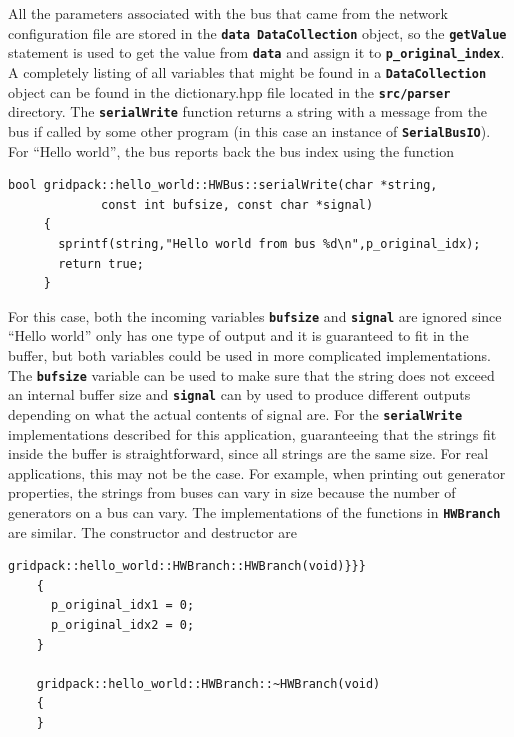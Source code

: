 \documentclass[12pt]{report} %
\begin{document}
All the parameters associated with the bus that came from the network configuration file are stored in the \texttt{\textbf{data DataCollection}} object, so the \texttt{\textbf{getValue}} statement is used to get the value from \texttt{\textbf{data}} and assign it to \texttt{\textbf{p\_original\_index}}. A completely listing of all variables that might be found in a \texttt{\textbf{DataCollection}} object can be found in the dictionary.hpp file located in the \texttt{\textbf{src/parser}} directory.
The \texttt{\textbf{serialWrite}} function returns a string with a message from the bus if called by some other program (in this case an instance of \texttt{\textbf{SerialBusIO}}). For ``Hello world'', the bus reports back the bus index using the function

{
\color{red}
\begin{Verbatim}[fontseries=b]
     bool gridpack::hello_world::HWBus::serialWrite(char *string,
             const int bufsize, const char *signal)
     {
       sprintf(string,"Hello world from bus %d\n",p_original_idx);
       return true;
     }
\end{Verbatim}
}

For this case, both the incoming variables \texttt{\textbf{bufsize}} and \texttt{\textbf{signal}} are ignored since ``Hello world'' only has one type of output and it is guaranteed to fit in the buffer, but both variables could be used in more complicated implementations. The \texttt{\textbf{bufsize}} variable can be used to make sure that the string does not exceed an internal buffer size and \texttt{\textbf{signal}} can by used to produce different outputs depending on what the actual contents of signal are. For the \texttt{\textbf{serialWrite}} implementations described for this application, guaranteeing that the strings fit inside the buffer  is straightforward, since all strings are the same size. For real applications, this may not be the case. For example, when printing out generator properties, the strings from buses can vary in size because the number of generators on a bus can vary.
The implementations of the functions in \texttt{\textbf{HWBranch}} are similar. The constructor and destructor are

{
\color{red}
\begin{Verbatim}[fontseries=b]
    gridpack::hello_world::HWBranch::HWBranch(void)}}}
    {
      p_original_idx1 = 0;
      p_original_idx2 = 0;
    }

    gridpack::hello_world::HWBranch::~HWBranch(void)
    {
    }
\end{Verbatim}
}
\end{document}
